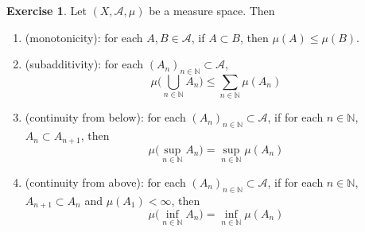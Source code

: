 \documentclass{book}
\theoremstyle{definition}
\newtheorem{ex}[definition]{Exercise}
\newcommand{\N}{\mathbb{N}}
\newcommand{\MA}{\mathcal{A}}
\newcommand{\lex}[1]{\label{ex:#1}}
\DeclareMathOperator*{\0}{\mbf{0}}
\DeclareMathOperator*{\1}{\mbf{1}}
\begin{document}
	\begin{ex} \lex{00000} 
		Let $(X, \MA, \mu)$ be a measure space. Then 
		\begin{enumerate}
			\item (monotonicity): for each $A,B \in \MA$, if $A \subset B$, then $\mu(A) \leq \mu(B)$.
			\item (subadditivity): for each $(A_n)_{n \in \N} \subset \MA$, $$\mu \bigg( \bigcup_{n \in \N} A_n \bigg) \leq \sum_{n \in \N}\mu(A_n)$$
			\item (continuity from below): for each $(A_n)_{n \in \N} \subset \MA$, if for each $n \in \N$, $A_n \subset A_{n+1}$, then $$\mu\bigg(\sup_{n \in \N} A_n\bigg) = \sup_{n \in \N}\mu(A_n)$$
			\item (continuity from above): for each $(A_n)_{n \in \N} \subset \MA$, if for each $n \in \N$, $ A_{n+1} \subset A_n$ and $\mu(A_1) < \infty$, then $$\mu\bigg(\inf_{n \in \N} A_n\bigg) = \inf_{n \in \N}\mu(A_n)$$
		\end{enumerate}
		
	\end{ex}
	
\end{document}
